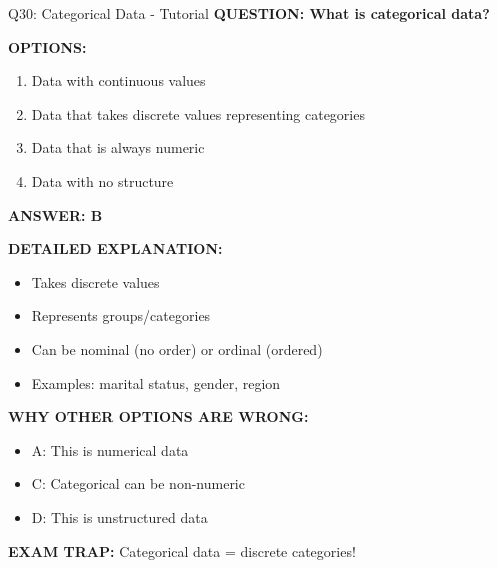 \documentclass[8pt]{beamer}
\begin{document}
	\begin{frame}{Q30: Categorical Data - Tutorial}
		\fontsize{6.5}{7.5}\selectfont
		\textbf{QUESTION: What is categorical data?}
		
		\vspace{0.1cm}
		\textbf{OPTIONS:}
		\begin{enumerate}
			\item Data with continuous values
			\item Data that takes discrete values representing categories
			\item Data that is always numeric
			\item Data with no structure
		\end{enumerate}
		
		\vspace{0.1cm}
		\textcolor{myblue}{\textbf{ANSWER: B}}
		
		\vspace{0.1cm}
		\textbf{DETAILED EXPLANATION:}
		\begin{itemize}
			\item Takes discrete values
			\item Represents groups/categories
			\item Can be nominal (no order) or ordinal (ordered)
			\item Examples: marital status, gender, region
		\end{itemize}
		
		\vspace{0.1cm}
		\textcolor{myred}{\textbf{WHY OTHER OPTIONS ARE WRONG:}}
		\begin{itemize}
			\item \textcolor{myred}{A:} This is numerical data
			\item \textcolor{myred}{C:} Categorical can be non-numeric
			\item \textcolor{myred}{D:} This is unstructured data
		\end{itemize}
		
		\textcolor{myred}{\textbf{EXAM TRAP:}} Categorical data = \textcolor{myblue}{discrete categories}!
	\end{frame}
	
\end{document}
